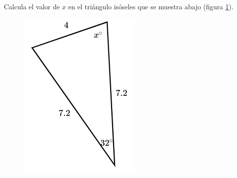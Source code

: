 Calcula el valor de $x$ en el triángulo isóseles  que se muestra abajo (figura \ref{fig:findangle13}).

\begin{minipage}[t][][t]{0.35\textwidth}
    \begin{figure}[H]
        \centering
        \includegraphics[width=0.7\linewidth]{../images/findangle13.png}
        \caption{}
        \label{fig:findangle13}
    \end{figure}
\end{minipage}\hfill
